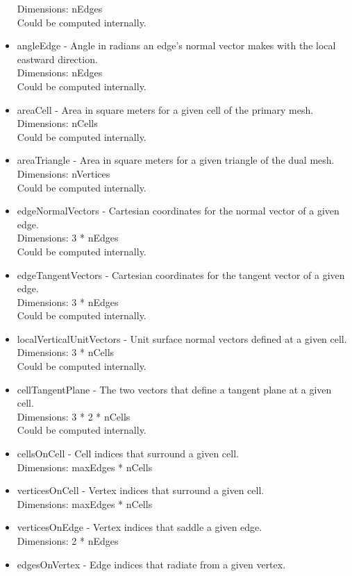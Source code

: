 \documentclass[11pt]{report}
\begin{document}
\begin{itemize}
		  Dimensions: nEdges \\
		  Could be computed internally. 
	\item angleEdge - Angle in radians an edge's normal vector makes with the local eastward direction. \\
		  Dimensions: nEdges \\
		  Could be computed internally. 
	\item areaCell - Area in square meters for a given cell of the primary mesh. \\
		  Dimensions: nCells \\
		  Could be computed internally. 
	\item areaTriangle - Area in square meters for a given triangle of the dual mesh. \\
		  Dimensions: nVertices \\
		  Could be computed internally. 
	\item edgeNormalVectors - Cartesian coordinates for the normal vector of a given edge. \\
		  Dimensions: 3 * nEdges \\
		  Could be computed internally. 
	\item edgeTangentVectors - Cartesian coordinates for the tangent vector of a given edge. \\
		  Dimensions: 3 * nEdges \\
		  Could be computed internally. 
	\item localVerticalUnitVectors - Unit surface normal vectors defined at a given cell. \\
		  Dimensions: 3 * nCells \\
		  Could be computed internally. 
	\item cellTangentPlane - The two vectors that define a tangent plane at a given cell. \\
		  Dimensions: 3 * 2 * nCells \\
		  Could be computed internally. 
	\item cellsOnCell - Cell indices that surround a given cell. \\
		  Dimensions: maxEdges * nCells
	\item verticesOnCell - Vertex indices that surround a given cell. \\
		  Dimensions: maxEdges * nCells
	\item verticesOnEdge - Vertex indices that saddle a given edge. \\
		  Dimensions: 2 * nEdges
	\item edgesOnVertex - Edge indices that radiate from a given vertex. \\

\end{itemize}
\end{document}
